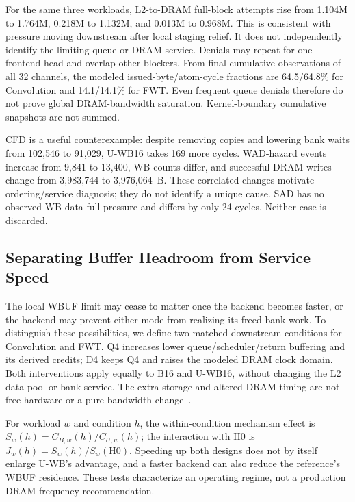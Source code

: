 \documentclass[conference,letterpaper]{IEEEtran}
\begin{document}
For the same three workloads, L2-to-DRAM full-block attempts rise from 1.104M to 1.764M, 0.218M to 1.132M, and 0.013M to 0.968M. This is consistent with pressure moving downstream after local staging relief. It does not independently identify the limiting queue or DRAM service. Denials may repeat for one frontend head and overlap other blockers. From final cumulative observations of all 32 channels, the modeled issued-byte/atom-cycle fractions are 64.5/64.8\% for Convolution and 14.1/14.1\% for FWT. Even frequent queue denials therefore do not prove global DRAM-bandwidth saturation. Kernel-boundary cumulative snapshots are not summed.

CFD is a useful counterexample: despite removing copies and lowering bank waits from 102,546 to 91,029, U-WB16 takes 169 more cycles. WAD-hazard events increase from 9,841 to 13,400, WB counts differ, and successful DRAM writes change from 3,983,744 to 3,976,064~B. These correlated changes motivate ordering/service diagnosis; they do not identify a unique cause. SAD has no observed WB-data-full pressure and differs by only 24 cycles. Neither case is discarded.



\subsection{Separating Buffer Headroom from Service Speed}
The local WBUF limit may cease to matter once the backend becomes faster, or the backend may prevent either mode from realizing its freed bank work. To distinguish these possibilities, we define two matched downstream conditions for Convolution and FWT. Q4 increases lower queue/scheduler/return buffering and its derived credits; D4 keeps Q4 and raises the modeled DRAM clock domain. Both interventions apply equally to B16 and U-WB16, without changing the L2 data pool or bank service. The extra storage and altered DRAM timing are not free hardware or a pure bandwidth change~\cite{sms}.

For workload $w$ and condition $h$, the within-condition mechanism effect is $S_w(h)=C_{B,w}(h)/C_{U,w}(h)$; the interaction with H0 is $J_w(h)=S_w(h)/S_w(\mathrm{H0})$. Speeding up both designs does not by itself enlarge U-WB's advantage, and a faster backend can also reduce the reference's WBUF residence. These tests characterize an operating regime, not a production DRAM-frequency recommendation.
\end{document}
